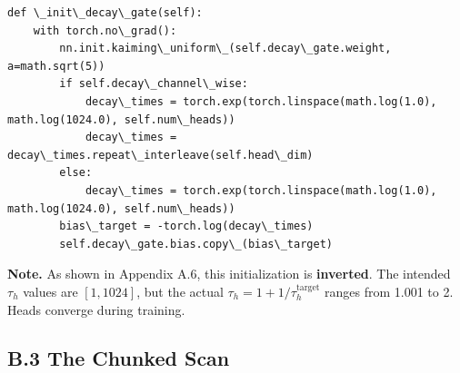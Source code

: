 \begin{lstlisting}
def \_init\_decay\_gate(self):
    with torch.no\_grad():
        nn.init.kaiming\_uniform\_(self.decay\_gate.weight, a=math.sqrt(5))
        if self.decay\_channel\_wise:
            decay\_times = torch.exp(torch.linspace(math.log(1.0), math.log(1024.0), self.num\_heads))
            decay\_times = decay\_times.repeat\_interleave(self.head\_dim)
        else:
            decay\_times = torch.exp(torch.linspace(math.log(1.0), math.log(1024.0), self.num\_heads))
        bias\_target = -torch.log(decay\_times)
        self.decay\_gate.bias.copy\_(bias\_target)
\end{lstlisting}

\textbf{Note.} As shown in Appendix A.6, this initialization is \textbf{inverted}. 
The intended $\tau_h$ values are $[1, 1024]$, but the actual $\tau_h = 1 + 1/\tau_h^\text{target}$ 
ranges from 1.001 to 2. Heads converge during training.

\subsection{B.3 The Chunked Scan}

